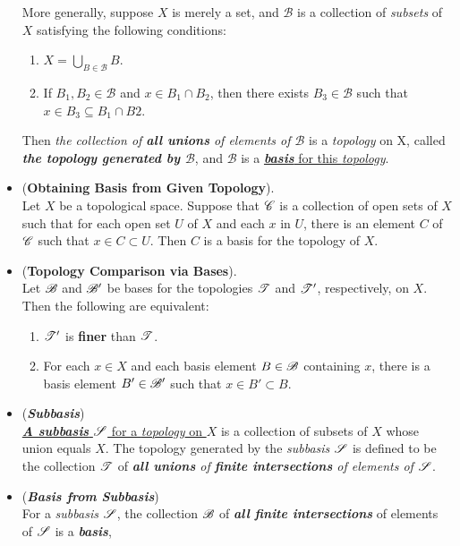 \documentclass[11pt]{article}
\begin{document}
\begin{itemize}
\begin{definition}
More generally, suppose $X$ is merely a set, and $\mathscr{B}$ is a collection of \emph{subsets} of $X$ satisfying the following conditions:
\begin{enumerate}
\item $X = \bigcup_{B \in \mathscr{B}}B$.
\item If $B_1, B_2 \in \mathscr{B}$ and $x \in B_1 \cap B_2$, then there exists $B_3 \in \mathscr{B}$ such that $x \in B_3 \subseteq B_1 \cap B2$.
\end{enumerate}
Then \emph{the collection of \textbf{all unions} of elements of $\mathscr{B}$} is a \emph{topology} on X, called \emph{\textbf{the topology generated by $\mathscr{B}$}}, and $\mathscr{B}$ is a \underline{\emph{\textbf{basis}} for this \emph{topology}}.
\end{definition}

\item \begin{lemma} (\textbf{Obtaining Basis from Given Topology}). \citep{munkres2000topology}\\
Let $X$ be a topological space. Suppose that ${\mathscr C}$ is a collection of open sets of $X$ such that for each open set $U$ of $X$ and each $x$ in $U$, there is an element $C$ of ${\mathscr C}$ such that $x \in C \subset U$. Then $C$ is a basis for the topology of $X$.
\end{lemma}

\item \begin{lemma} (\textbf{Topology Comparison via Bases}). \citep{munkres2000topology}\\
Let ${\mathscr B}$ and ${\mathscr B}'$ be bases for the topologies ${\mathscr T}$ and ${\mathscr T}'$, respectively, on $X$. Then the following are equivalent:
\begin{enumerate}
\item  ${\mathscr T}'$ is \textbf{finer} than ${\mathscr T}$.
\item For each $x \in X$ and each basis element $B \in {\mathscr B}$ containing $x$, there is a basis element $B' \in {\mathscr B}'$ such that $x \in B' \subset B$.
\end{enumerate}
\end{lemma}

\item \begin{definition}(\emph{\textbf{Subbasis}})\\
\underline{\emph{\textbf{A subbasis}} ${\mathscr S}$ for a \emph{topology} on $X$} is a collection of subsets of $X$ whose union equals $X$. The topology generated by the \emph{subbasis} ${\mathscr S}$ is defined to be the  collection ${\mathscr T}$ of \emph{\textbf{all unions} of \textbf{finite intersections} of elements of ${\mathscr S}$}.
\end{definition}

\item \begin{remark}(\textbf{\emph{Basis from Subbasis}})\\
For a \emph{subbasis} ${\mathscr S}$, the collection ${\mathscr B}$ of \emph{\textbf{all finite intersections}} of elements of ${\mathscr S}$ is a \emph{\textbf{basis}},
\end{remark}
\end{itemize}
\end{document}
